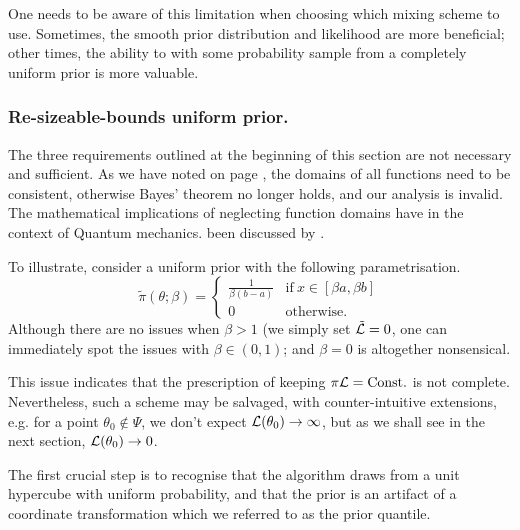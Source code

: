 \documentclass[usenatbib]{mnras}
\begin{document}
One needs to be aware of this limitation when choosing which
mixing scheme to use. Sometimes, the smooth prior distribution and
likelihood are more beneficial; other times, the ability to with
some probability sample from a completely uniform prior is more
valuable. 

\subsubsection{Re-sizeable-bounds uniform prior.}
\label{sec:org76956d5}

The three requirements outlined at the beginning of this section
are not necessary and sufficient. As we have noted on page
\pageref{domain-discussion}, the domains of all functions need to be
consistent, otherwise Bayes' theorem no longer holds, and our
analysis is invalid. The mathematical implications of neglecting
function domains have in the context of Quantum mechanics. been
discussed by \cite{Gieres_2000}.

To illustrate, consider a uniform prior with the following
parametrisation.
\begin{equation}
  \tilde{\pi}(\theta; \beta) =
  \begin{cases}
	\frac{1}{\beta(b-a)} & \text{if}\ x \in [\beta a, \beta b] \\
	0 & \text{otherwise}.
  \end{cases}
\end{equation}
Although there are no issues when \(\beta>1\) (we simply set \({\cal
	\tilde{L}}=0\), one can immediately spot the issues with \(\beta \in (0,1)\);
and \(\beta=0\) is altogether nonsensical.

This issue indicates that the prescription of keeping \(\pi {\cal
	L} = \text{Const.}\) is not complete. Nevertheless, such a scheme
may be salvaged, with counter-intuitive extensions, e.g. for a
point \(\theta_{0} \notin \Psi\), we don't expect \({\cal
	L}(\theta_{0}) \rightarrow \infty\), but as we shall see in the
next section, \({\cal L}(\theta_{0}) \rightarrow 0\).

The first crucial step is to recognise that the algorithm draws
from a unit hypercube with uniform probability, and that the prior
is an artifact of a coordinate transformation which we referred to
as the prior quantile.
\end{document}
